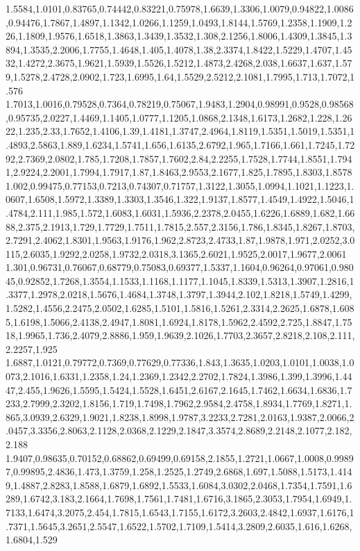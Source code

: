 1.5584,1.0101,0.83765,0.74442,0.83221,0.75978,1.6639,1.3306,1.0079,0.94822,1.0086,0.94476,1.7867,1.4897,1.1342,1.0266,1.1259,1.0493,1.8144,1.5769,1.2358,1.1909,1.226,1.1809,1.9576,1.6518,1.3863,1.3439,1.3532,1.308,2.1256,1.8006,1.4309,1.3845,1.3894,1.3535,2.2006,1.7755,1.4648,1.405,1.4078,1.38,2.3374,1.8422,1.5229,1.4707,1.4532,1.4272,2.3675,1.9621,1.5939,1.5526,1.5212,1.4873,2.4268,2.038,1.6637,1.637,1.579,1.5278,2.4728,2.0902,1.723,1.6995,1.64,1.5529,2.5212,2.1081,1.7995,1.713,1.7072,1.576
1.7013,1.0016,0.79528,0.7364,0.78219,0.75067,1.9483,1.2904,0.98991,0.9528,0.98568,0.95735,2.0227,1.4469,1.1405,1.0777,1.1205,1.0868,2.1348,1.6173,1.2682,1.228,1.2622,1.235,2.33,1.7652,1.4106,1.39,1.4181,1.3747,2.4964,1.8119,1.5351,1.5019,1.5351,1.4893,2.5863,1.889,1.6234,1.5741,1.656,1.6135,2.6792,1.965,1.7166,1.661,1.7245,1.7292,2.7369,2.0802,1.785,1.7208,1.7857,1.7602,2.84,2.2255,1.7528,1.7744,1.8551,1.7941,2.9224,2.2001,1.7994,1.7917,1.87,1.8463,2.9553,2.1677,1.825,1.7895,1.8303,1.8578
1.002,0.99475,0.77153,0.7213,0.74307,0.71757,1.3122,1.3055,1.0994,1.1021,1.1223,1.0607,1.6508,1.5972,1.3389,1.3303,1.3546,1.322,1.9137,1.8577,1.4549,1.4922,1.5046,1.4784,2.111,1.985,1.572,1.6083,1.6031,1.5936,2.2378,2.0455,1.6226,1.6889,1.682,1.6688,2.375,2.1913,1.729,1.7729,1.7511,1.7815,2.557,2.3156,1.786,1.8345,1.8267,1.8703,2.7291,2.4062,1.8301,1.9563,1.9176,1.962,2.8723,2.4733,1.87,1.9878,1.971,2.0252,3.0115,2.6035,1.9292,2.0258,1.9732,2.0318,3.1365,2.6021,1.9525,2.0017,1.9677,2.0061
1.301,0.96731,0.76067,0.68779,0.75083,0.69377,1.5337,1.1604,0.96264,0.97061,0.98045,0.92852,1.7268,1.3554,1.1533,1.1168,1.1177,1.1045,1.8339,1.5313,1.3907,1.2816,1.3377,1.2978,2.0218,1.5676,1.4684,1.3748,1.3797,1.3944,2.102,1.8218,1.5749,1.4299,1.5282,1.4556,2.2475,2.0502,1.6285,1.5101,1.5816,1.5261,2.3314,2.2625,1.6878,1.6085,1.6198,1.5066,2.4138,2.4947,1.8081,1.6924,1.8178,1.5962,2.4592,2.725,1.8847,1.7518,1.9965,1.736,2.4079,2.8886,1.959,1.9639,2.1026,1.7703,2.3657,2.8218,2.108,2.111,2.2257,1.925
1.6887,1.0121,0.79772,0.7369,0.77629,0.77336,1.843,1.3635,1.0203,1.0101,1.0038,1.0073,2.1016,1.6331,1.2358,1.24,1.2369,1.2342,2.2702,1.7824,1.3986,1.399,1.3996,1.4447,2.455,1.9626,1.5595,1.5424,1.5528,1.6451,2.6167,2.1645,1.7462,1.6634,1.6836,1.7233,2.7999,2.3202,1.8156,1.719,1.7498,1.7962,2.9584,2.4758,1.8934,1.7769,1.8271,1.865,3.0939,2.6329,1.9021,1.8238,1.8998,1.9787,3.2233,2.7281,2.0163,1.9387,2.0066,2.0457,3.3356,2.8063,2.1128,2.0368,2.1229,2.1847,3.3574,2.8689,2.2148,2.1077,2.182,2.188
1.9407,0.98635,0.70152,0.68862,0.69499,0.69158,2.1855,1.2721,1.0667,1.0008,0.99897,0.99895,2.4836,1.473,1.3759,1.258,1.2525,1.2749,2.6868,1.697,1.5088,1.5173,1.4149,1.4887,2.8283,1.8588,1.6879,1.6892,1.5533,1.6084,3.0302,2.0468,1.7354,1.7591,1.6289,1.6742,3.183,2.1664,1.7698,1.7561,1.7481,1.6716,3.1865,2.3053,1.7954,1.6949,1.7133,1.6474,3.2075,2.454,1.7815,1.6543,1.7155,1.6172,3.2603,2.4842,1.6937,1.6176,1.7371,1.5645,3.2651,2.5547,1.6522,1.5702,1.7109,1.5414,3.2809,2.6035,1.616,1.6268,1.6804,1.529
